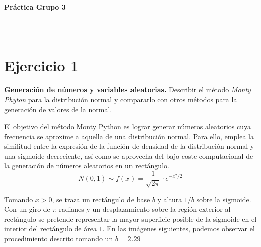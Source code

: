 \documentclass[a4paper,12pt]{article}
\begin{document}
	
	\setlength{\parindent}{0.5cm}
	\setlength{\voffset}{-2cm}
	\setlength{\hoffset}{-2cm}
	
	\begin{center}
		\begin{LARGE}
			\textbf{Práctica Grupo 3}
		\end{LARGE}
		\begin{Large}
			\\ \medskip {}
		\end{Large}
		\rule{14cm}{0.5mm}
	\end{center}
	
	
	\tableofcontents
	
\newpage
	\section*{Ejercicio 1}
	\textbf{Generación de números y variables aleatorias.} Describir el método \textit{Monty Phyton} para la distribución normal y compararlo con otros métodos para la
generación de valores de la normal.
	
	El objetivo del método Monty Python es lograr generar números aleatorios cuya frecuencia se aproxime a aquella de una distribución normal. Para ello, emplea la similitud entre la expresión de la función de densidad de la distribución normal y una sigmoide decreciente, así como se aprovecha del bajo coste computacional de la generación de números aleatorios en un rectángulo.
	$$ N(0,1) \sim f(x) = \dfrac{1}{\sqrt{2\pi}} \cdot e^{-x^2/2} $$
	
	Tomando $x>0$, se traza un rectángulo de base $b$ y altura $1/b$ sobre la sigmoide. Con un giro de $\pi$ radianes y un desplazamiento sobre la región exterior al rectángulo se pretende representar la mayor superficie posible de la sigmoide en el interior del rectángulo de área $1$. En las imágenes siguientes, podemos observar el procedimiento descrito tomando un $b=2.29$
	
\end{document}

